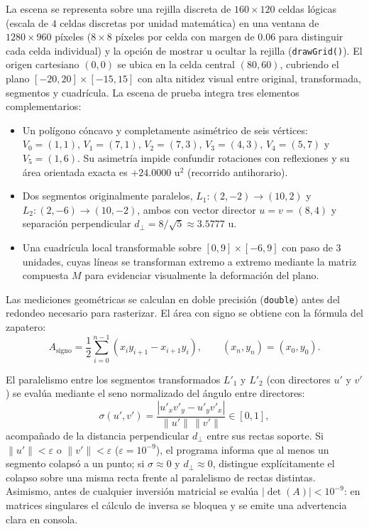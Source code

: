 \documentclass[a4paper,10pt]{article}
\begin{document}
La escena se representa sobre una rejilla discreta de $160\times 120$ celdas lógicas (escala de $4$ celdas discretas por unidad matemática) en una ventana de $1280\times 960$ píxeles ($8\times 8$ píxeles por celda con margen de $0.06$ para distinguir cada celda individual) y la opción de mostrar u ocultar la rejilla (\texttt{drawGrid()}). El origen cartesiano $(0,0)$ se ubica en la celda central $(80,60)$, cubriendo el plano $[-20, 20]\times[-15, 15]$ con alta nitidez visual entre original, transformada, segmentos y cuadrícula. La escena de prueba integra tres elementos complementarios:
\begin{itemize}
  \item Un polígono cóncavo y completamente asimétrico de seis vértices: $V_0=(1,1)$, $V_1=(7,1)$, $V_2=(7,3)$, $V_3=(4,3)$, $V_4=(5,7)$ y $V_5=(1,6)$. Su asimetría impide confundir rotaciones con reflexiones y su área orientada exacta es $+24.0000\text{ u}^2$ (recorrido antihorario).
  \item Dos segmentos originalmente paralelos, $L_1: (2,-2)\to(10,2)$ y $L_2: (2,-6)\to(10,-2)$, ambos con vector director $u = v = (8, 4)$ y separación perpendicular $d_\perp = 8/\sqrt{5} \approx 3.5777\text{ u}$.
  \item Una cuadrícula local transformable sobre $[0,9]\times[-6,9]$ con paso de $3$ unidades, cuyas líneas se transforman extremo a extremo mediante la matriz compuesta $M$ para evidenciar visualmente la deformación del plano.
\end{itemize}

Las mediciones geométricas se calculan en doble precisión (\texttt{double}) antes del redondeo necesario para rasterizar. El área con signo se obtiene con la fórmula del zapatero:
\begin{equation}
  A_{\text{signo}} = \frac{1}{2}\sum_{i=0}^{n-1}(x_i y_{i+1} - x_{i+1} y_i), \qquad (x_n, y_n) = (x_0, y_0).
\end{equation}

El paralelismo entre los segmentos transformados $L'_1$ y $L'_2$ (con directores $u'$ y $v'$) se evalúa mediante el seno normalizado del ángulo entre directores:
\begin{equation}
  \sigma(u', v') = \frac{|u'_x v'_y - u'_y v'_x|}{\|u'\|\,\|v'\|} \in [0, 1],
\end{equation}
acompañado de la distancia perpendicular $d_\perp$ entre sus rectas soporte. Si $\|u'\| < \varepsilon$ o $\|v'\| < \varepsilon$ ($\varepsilon = 10^{-9}$), el programa informa que al menos un segmento colapsó a un punto; si $\sigma \approx 0$ y $d_\perp \approx 0$, distingue explícitamente el colapso sobre una misma recta frente al paralelismo de rectas distintas. Asimismo, antes de cualquier inversión matricial se evalúa $|\det(A)| < 10^{-9}$: en matrices singulares el cálculo de inversa se bloquea y se emite una advertencia clara en consola.
\end{document}
